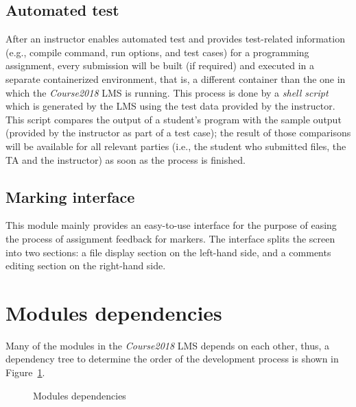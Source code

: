 \subsection{Automated test}
After an instructor enables automated test and provides test-related
information (e.g., compile command, run options, and test cases) for a
programming assignment,
every submission will be built (if required) and executed in a separate
containerized environment, that is, a different
container than the one in which the \emph{Course2018} LMS is running.
This process is done by a \emph{shell script} which is generated by the LMS
using the test data provided by the instructor. This script compares the
output of a student's program with the sample output (provided by the instructor
as part of a test case); the result of those comparisons will be available for
all relevant parties (i.e., the student who submitted files, the TA and
the instructor) as soon as the process is finished.

\subsection{Marking interface}
This module mainly provides an easy-to-use interface for the
purpose of easing the process of assignment feedback for markers.
The interface splits the screen into two sections: a file display section on the
left-hand side, and a comments editing section on the right-hand side.

\section{Modules dependencies}
Many of the modules in the \emph{Course2018} LMS depends on each other,
thus, a dependency tree to determine the order of the development
process is shown in Figure~\ref{fig:DEP}.

\begin{figure}[H]
    \centering

    \usetikzlibrary{er, positioning, arrows}
    \caption{Modules dependencies}
    \label{fig:DEP}
\end{figure}

